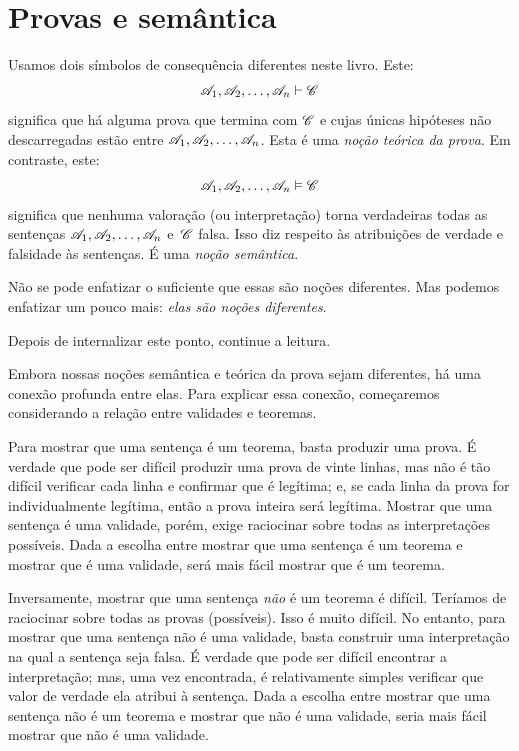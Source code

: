 \chapter{Provas e semântica}
Usamos dois símbolos de consequência diferentes neste livro. Este:
$$\mathscr{A}_1, \mathscr{A}_2, \ldots, \mathscr{A}_n \vdash \mathscr{C}$$
significa que há alguma prova que termina com $\mathscr{C}$ e cujas únicas hipóteses não descarregadas estão entre $\mathscr{A}_1, \mathscr{A}_2, \ldots, \mathscr{A}_n$. Esta é uma \emph{noção teórica da prova}. Em contraste, este:
$$\mathscr{A}_1, \mathscr{A}_2, \ldots, \mathscr{A}_n \vDash \mathscr{C}$$
significa que nenhuma valoração (ou interpretação) torna verdadeiras todas as sentenças $\mathscr{A}_1, \mathscr{A}_2, \ldots, \mathscr{A}_n$ e~$\mathscr{C}$ falsa. Isso diz respeito às atribuições de verdade e falsidade às sentenças. É uma \emph{noção semântica}.

Não se pode enfatizar o suficiente que essas são noções diferentes. Mas podemos enfatizar um pouco mais: \emph{elas são noções diferentes}.

Depois de internalizar este ponto, continue a leitura.

Embora nossas noções semântica e teórica da prova sejam diferentes, há uma conexão profunda entre elas. Para explicar essa conexão, começaremos considerando a relação entre validades e teoremas.

Para mostrar que uma sentença é um teorema, basta produzir uma prova. É verdade que pode ser difícil produzir uma prova de vinte linhas, mas não é tão difícil verificar cada linha e confirmar que é legítima; e, se cada linha da prova for individualmente legítima, então a prova inteira será legítima. Mostrar que uma sentença é uma validade, porém, exige raciocinar sobre todas as interpretações possíveis. Dada a escolha entre mostrar que uma sentença é um teorema e mostrar que é uma validade, será mais fácil mostrar que é um teorema.

Inversamente, mostrar que uma sentença \emph{não} é um teorema é difícil. Teríamos de raciocinar sobre todas as provas (possíveis). Isso é muito difícil. No entanto, para mostrar que uma sentença não é uma validade, basta construir uma interpretação na qual a sentença seja falsa. É verdade que pode ser difícil encontrar a interpretação; mas, uma vez encontrada, é relativamente simples verificar que valor de verdade ela atribui à sentença. Dada a escolha entre mostrar que uma sentença não é um teorema e mostrar que não é uma validade, seria mais fácil mostrar que não é uma validade.

